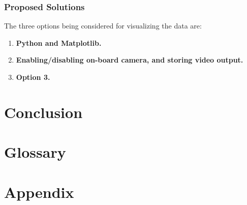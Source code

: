 \documentclass[letterpaper,10pt]{article}
\begin{document}
\subsubsection{Proposed Solutions}
The three options being considered for visualizing the data are:
\begin{enumerate}
\item{
\textbf{Python and Matplotlib.}
}

\item{
\textbf{Enabling/disabling on-board camera, and storing video output.}
}

\item{
\textbf{Option 3.}
}
\end{enumerate}

\section{Conclusion}

\section{Glossary}
\glsaddall
\printglossaries

\section{Appendix}

\end{document}
